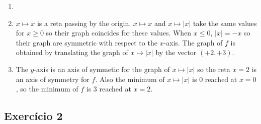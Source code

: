 \begin{enumerate}
\item
  \begin{center}
  \end{center}
\item
  $x \mapsto x$ is a reta passing by the origin.
  $x \mapsto x$ and $x \mapsto |x|$ take the same values for $x \geq 0$
  so their graph coincides for these values. When $x \leq 0$,
  $|x| = -x$ so their graph are symmetric with respect to the $x$-axis.
  The graph of $f$ is obtained by translating the graph of $x \mapsto |x|$
  by the vector $(+2,+3)$.
\item The $y$-axis is an axis of symmetic for the graph of $x \mapsto |x|$
  so the reta $x = 2$ is an axis of symmetry for $f$.
  Also the minimum of $x \mapsto |x|$ is $0$ reached at $x=0$,
  so the minimum of $f$ is $3$ reached at $x=2$.
\end{enumerate}

\subsection*{Exercício 2}

